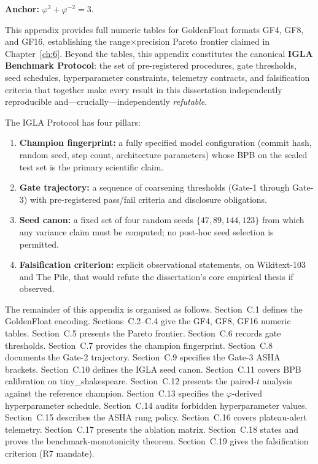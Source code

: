 \textbf{Anchor:} \(\varphi^2 + \varphi^{-2} = 3\).

\noindent This appendix provides full numeric tables for GoldenFloat
formats GF4, GF8, and GF16, establishing the range$\times$precision
Pareto frontier claimed in Chapter~\ref{ch:6}.  Beyond the tables, this
appendix constitutes the canonical \textbf{IGLA Benchmark Protocol}:
the set of pre-registered procedures, gate thresholds, seed schedules,
hyperparameter constraints, telemetry contracts, and falsification
criteria that together make every result in this dissertation
independently reproducible and---crucially---independently
\emph{refutable}.

The IGLA Protocol has four pillars:
\begin{enumerate}
  \item \textbf{Champion fingerprint:} a fully specified model
        configuration (commit hash, random seed, step count, architecture
        parameters) whose BPB on the sealed test set is the primary
        scientific claim.
  \item \textbf{Gate trajectory:} a sequence of coarsening thresholds
        (Gate-1 through Gate-3) with pre-registered pass/fail criteria
        and disclosure obligations.
  \item \textbf{Seed canon:} a fixed set of four random seeds
        $\{47, 89, 144, 123\}$ from which any variance claim must be
        computed; no post-hoc seed selection is permitted.
  \item \textbf{Falsification criterion:} explicit observational
        statements, on Wikitext-103 and The Pile, that would refute the
        dissertation's core empirical thesis if observed.
\end{enumerate}

The remainder of this appendix is organised as follows.
Section~C.1 defines the GoldenFloat encoding.
Sections~C.2--C.4 give the GF4, GF8, GF16 numeric tables.
Section~C.5 presents the Pareto frontier.
Section~C.6 records gate thresholds.
Section~C.7 provides the champion fingerprint.
Section~C.8 documents the Gate-2 trajectory.
Section~C.9 specifies the Gate-3 ASHA brackets.
Section~C.10 defines the IGLA seed canon.
Section~C.11 covers BPB calibration on tiny\_shakespeare.
Section~C.12 presents the paired-$t$ analysis against the reference
champion.
Section~C.13 specifies the $\varphi$-derived hyperparameter schedule.
Section~C.14 audits forbidden hyperparameter values.
Section~C.15 describes the ASHA rung policy.
Section~C.16 covers plateau-alert telemetry.
Section~C.17 presents the ablation matrix.
Section~C.18 states and proves the benchmark-monotonicity theorem.
Section~C.19 gives the falsification criterion (R7 mandate).

